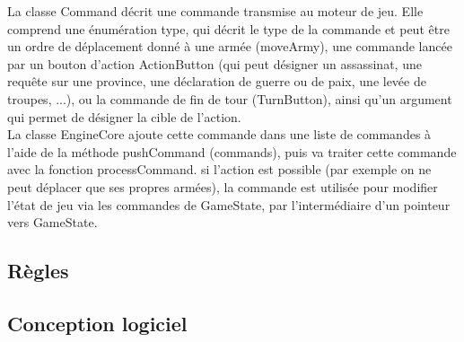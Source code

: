 \documentclass[a4paper,12pt]{article}
\begin{document}
La classe Command décrit une commande transmise au moteur de jeu. Elle comprend une énumération type, qui décrit le type de la commande et peut être un ordre de déplacement donné à une armée (moveArmy), une commande lancée par un bouton d'action ActionButton (qui peut désigner un assassinat, une requête sur une province, une déclaration de guerre ou de paix, une levée de troupes, ...), ou la commande de fin de tour (TurnButton), ainsi qu'un argument qui permet de désigner la cible de l'action.\\

La classe EngineCore ajoute cette commande dans une liste de commandes à l'aide de la méthode pushCommand (commands), puis va traiter cette commande avec la fonction processCommand. si l'action est possible (par exemple on ne peut déplacer que ses propres armées), la commande est utilisée pour modifier l'état de jeu via les commandes de GameState, par l'intermédiaire d'un pointeur vers GameState.\\

\subsection{Règles}

\subsection{Conception logiciel}
\end{document}
